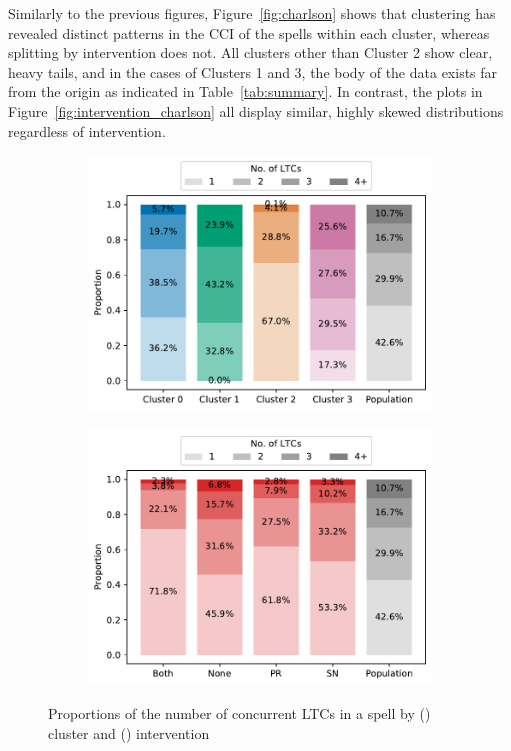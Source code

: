 Similarly to the previous figures, Figure~\ref{fig:charlson} shows that
clustering has revealed distinct patterns in the CCI of the spells within each
cluster, whereas splitting by intervention does not. All clusters other than
Cluster 2 show clear, heavy tails, and in the cases of Clusters 1 and 3, the
body of the data exists far from the origin as indicated in
Table~\ref{tab:summary}. In contrast, the plots in
Figure~\ref{fig:intervention_charlson} all display similar, highly skewed
distributions regardless of intervention.

\begin{figure}
    \centering
    \begin{subfigure}{\imgwidth}
        \includegraphics[width=\linewidth]{cluster_ltcs}
        \caption{}\label{fig:cluster_ltcs}
    \end{subfigure}

    \begin{subfigure}{\imgwidth}
        \includegraphics[width=\linewidth]{intervention_ltcs}
        \caption{}\label{fig:intervention_ltcs}
    \end{subfigure}
    \caption{%
        Proportions of the number of concurrent LTCs in a spell by
        () cluster and ()
        intervention
    }\label{fig:ltcs}
\end{figure}

